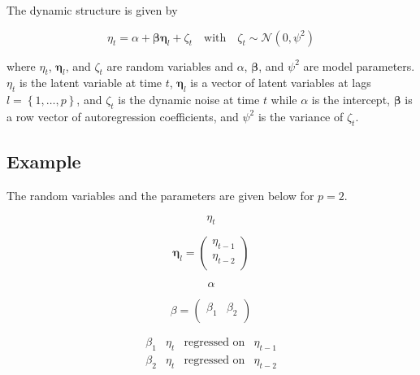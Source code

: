 \documentclass{article}
\begin{document}
The dynamic structure is given by

\begin{equation}
    \eta_{t}
    =
    \alpha
    +
    \boldsymbol{\beta}
    \boldsymbol{\eta}_{l}
    +
    \zeta_{t}
    \quad
    \mathrm{with}
    \quad
    \zeta_{t}
    \sim
    \mathcal{N}
    \left(
    0,
    \psi^{2}
    \right)
\end{equation}

\noindent where $\eta_{t}$, $\boldsymbol{\eta}_{l}$, and $\zeta_{t}$ are random variables and $\alpha$, $\boldsymbol{\beta}$, and $\psi^{2}$ are model parameters.
$\eta_{t}$ is the latent variable at time $t$, $\boldsymbol{\eta}_{l}$ is a vector of latent variables at lags $l = \left\{ 1, \dots, p \right\}$, and $\zeta_{t}$ is the dynamic noise at time $t$ while 
$\alpha$ is the intercept, $\boldsymbol{\beta}$ is a row vector of autoregression coefficients, and $\psi^{2}$ is the variance of $\zeta_{t}$.

\subsection{Example}

The random variables and the parameters are given below for $p = 2$.

\begin{equation}
    \eta_{t}
\end{equation}

\begin{equation}
    \boldsymbol{\eta}_{l}
    =
    \left(
    \begin{array}{c}
        \eta_{t - 1} \\
        \eta_{t - 2} \\
    \end{array}
    \right)
\end{equation}

\begin{equation}
    \alpha
\end{equation}

\begin{equation}
    \beta
    =
    \left(
    \begin{array}{cc}
        \beta_{1} & \beta_{2} \\
    \end{array}
    \right)
\end{equation}

\begin{equation}
    \begin{array}{c|ccc|}
        \beta_{1} & \eta_{t} & \text{regressed on} & \eta_{t - 1} \\
        \beta_{2} & \eta_{t} & \text{regressed on} & \eta_{t - 2} \\
    \end{array}
\end{equation}
\end{document}
